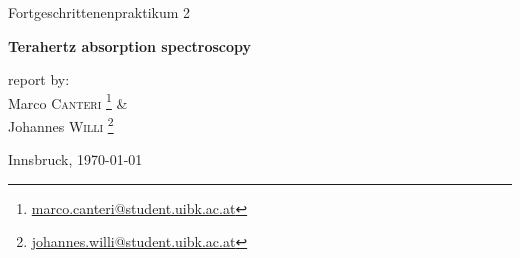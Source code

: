 \documentclass[a4paper,10pt]{scrartcl}
\begin{document}

\begin{titlepage}
 \begin{center}
	\Large{Fortgeschrittenenpraktikum 2}
	\end{center}
	\begin{center}
	 \LARGE{\textbf{Terahertz absorption spectroscopy}}
	\end{center}
	
	\begin{center}
	report by: \\
	Marco \textsc{Canteri} \footnote{\href{mailto:marco.canteri@student.uibk.ac.at}{marco.canteri@student.uibk.ac.at}} \& \\
	Johannes \textsc{Willi} \footnote{\href{mailto:johannes.willi@student.uibk.ac.at}{johannes.willi@student.uibk.ac.at}}
	\end{center}
	
	\begin{center}
	\vspace{1cm}
	Innsbruck, \today
	\vspace{2cm}
	\end{center}
	

\end{titlepage}
\end{document}
